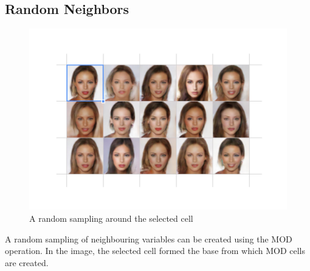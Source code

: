 \documentclass[letterpaper]{article}
\begin{document}
\subsection{Random Neighbors}
\begin{figure}[ht!]
  \centering
  \includegraphics[width=12cm]{figs/11-nearest-neighbours.jpg}
  \caption{A random sampling around the selected cell}
\end{figure}

A random sampling of neighbouring variables can be created using the MOD operation. In the image, the selected cell formed the base from which MOD cells are created.
\end{document}
